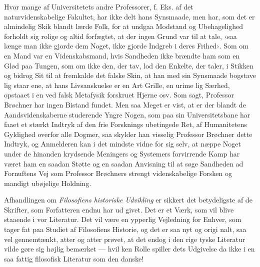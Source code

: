 \documentclass[12pt,a4paper,openany]{book}
\begin{document}
Hvor mange af Universitetets andre Professorer, f. Eks. af
det naturvidenskabelige Fakultet, har ikke delt hans Synsmaade,
men har, som det er almindelig Skik blandt lærde Folk, for at
undgaa Modstand og Ubehagelighed forholdt sig rolige og altid
forfægtet, at der ingen Grund var til at tale, ‹saa længe man
ikke gjorde dem Noget, ikke gjorde Indgreb i deres Frihed›.
Som om en Mand var en Videnskabsmand, hvis Sandheden ikke
brændte ham som en Glød paa Tungen, som om ikke den, der
tav, lod den Enkelte, der taler, i Stikken og bidrog Sit til at
fremkalde det falske Skin, at han med sin Synsmaade bogstave\-%
lig staar ene, at hans Livsanskuelse er en Art Grille, en urime\-%
lig Særhed, opstaaet i en ved falsk Metafysik forskruet Hjerne
osv. Som sagt, Professor Brøchner har ingen Bistand fundet.
Men saa Meget er vist, at er der blandt de Aandsvidenskaberne
studerende Yngre Nogen, som paa sin Universitetsbane har
faaet et stærkt Indtryk af den frie Forsknings ubetingede Ret,
af Humanitetens Gyldighed overfor alle Dogmer, saa skylder
han visselig Professor Brøchner dette Indtryk, og Anmelderen
kan i det mindste vidne for sig selv, at næppe Noget under de
hinanden krydsende Meningers og Systemers forvirrende Kamp
har været ham en saadan Støtte og en saadan Anvisning til at
søge Sandheden ad Fornuftens Vej som Professor Brøchners
strengt videnskabelige Forsken og mandigt ubøjelige Holdning.

Afhandlingen om \emph{Filosofiens historiske Udvikling} er sikkert
det betydeligste af de Skrifter, som Forfatteren endnu har ud\-%
givet. Det er et Værk, som vil blive staaende i vor Literatur.
Det vil være en ypperlig Vejledning for Enhver, som tager fat
paa Studiet af Filosofiens Historie, og det er saa nyt og origi\-%
nalt, saa vel gennemtænkt, atter og atter prøvet, at det endog i
den rige tyske Literatur vilde gøre sig højlig bemærket --- hvil\-%
ken Rolle spiller dets Udgivelse da ikke i en saa fattig filosofisk
Literatur som den danske!
\end{document}
